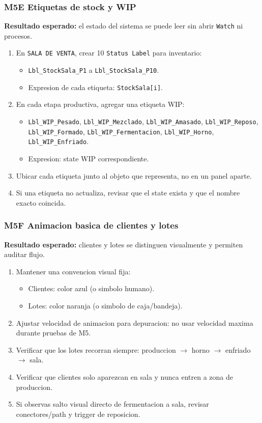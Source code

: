 \documentclass[11pt]{article}
\newcommand{\simio}[1]{\texttt{#1}}
\newcommand{\state}[1]{\texttt{#1}}
\begin{document}
\subsubsection{M5E Etiquetas de stock y WIP}
\textbf{Resultado esperado:} el estado del sistema se puede leer sin abrir \simio{Watch} ni procesos.

\begin{enumerate}
  \item En \simio{SALA DE VENTA}, crear 10 \simio{Status Label} para inventario:
  \begin{itemize}
    \item \simio{Lbl\_StockSala\_P1} a \simio{Lbl\_StockSala\_P10}.
    \item Expresion de cada etiqueta: \state{StockSala[i]}.
  \end{itemize}
  \item En cada etapa productiva, agregar una etiqueta WIP:
  \begin{itemize}
    \item \simio{Lbl\_WIP\_Pesado}, \simio{Lbl\_WIP\_Mezclado}, \simio{Lbl\_WIP\_Amasado}, \simio{Lbl\_WIP\_Reposo}, \simio{Lbl\_WIP\_Formado}, \simio{Lbl\_WIP\_Fermentacion}, \simio{Lbl\_WIP\_Horno}, \simio{Lbl\_WIP\_Enfriado}.
    \item Expresion: state WIP correspondiente.
  \end{itemize}
  \item Ubicar cada etiqueta junto al objeto que representa, no en un panel aparte.
  \item Si una etiqueta no actualiza, revisar que el state exista y que el nombre exacto coincida.
\end{enumerate}

\subsubsection{M5F Animacion basica de clientes y lotes}
\textbf{Resultado esperado:} clientes y lotes se distinguen visualmente y permiten auditar flujo.

\begin{enumerate}
  \item Mantener una convencion visual fija:
  \begin{itemize}
    \item Clientes: color azul (o simbolo humano).
    \item Lotes: color naranja (o simbolo de caja/bandeja).
  \end{itemize}
  \item Ajustar velocidad de animacion para depuracion: no usar velocidad maxima durante pruebas de M5.
  \item Verificar que los lotes recorran siempre: produccion \(\rightarrow\) horno \(\rightarrow\) enfriado \(\rightarrow\) sala.
  \item Verificar que clientes solo aparezcan en sala y nunca entren a zona de produccion.
  \item Si observas salto visual directo de fermentacion a sala, revisar conectores/path y trigger de reposicion.
\end{enumerate}
\end{document}
